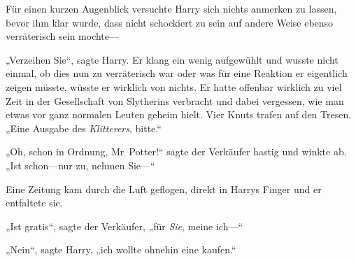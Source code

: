 
Für einen kurzen Augenblick versuchte Harry sich nichts anmerken zu lassen, bevor ihm klar wurde, dass nicht schockiert zu sein auf andere Weise ebenso verräterisch sein mochte—

„Verzeihen Sie“, sagte Harry. Er klang ein wenig aufgewühlt und wusste nicht einmal, ob dies nun zu verräterisch war oder was für eine Reaktion er eigentlich zeigen müsste, wüsste er wirklich von nichts. Er hatte offenbar wirklich zu viel Zeit in der Gesellschaft von Slytherins verbracht und dabei vergessen, wie man etwas vor ganz normalen Leuten geheim hielt. Vier Knuts trafen auf den Tresen. „Eine Ausgabe des \emph{Klitterers}, bitte.“

„Oh, schon in Ordnung, Mr~Potter!“ sagte der Verkäufer hastig und winkte ab. „Ist schon—nur zu, nehmen Sie—“

Eine Zeitung kam durch die Luft geflogen, direkt in Harrys Finger und er entfaltete sie.


„Ist gratis“, sagte der Verkäufer, „für \emph{Sie}, meine ich—“

„Nein“, sagte Harry, „ich wollte ohnehin eine kaufen.“

